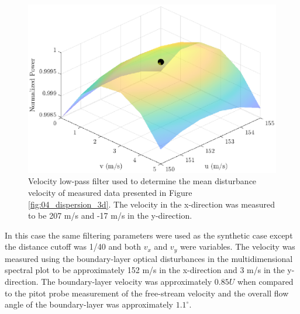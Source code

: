 \begin{figure}
 \centering
 \includegraphics{../matlab/06_single_sensor_filtering/filter_velocity_real.eps}
 \caption{Velocity low-pass filter used to determine the mean disturbance velocity of measured data presented in Figure \ref{fig:04_dispersion_3d}.  The velocity in the x-direction was measured to be 207 m/s and -17 m/s in the y-direction.}
 \label{fig:06_filter_velocity_real}
\end{figure}
In this case the same filtering parameters were used as the synthetic case except the distance cutoff was 1/40 and both $v_x$ and $v_y$ were variables.
The velocity was measured using the boundary-layer optical disturbances in the multidimensional spectral plot to be approximately 152 m/s in the x-direction and 3 m/s in the y-direction.
The boundary-layer velocity was approximately $0.85U$ when compared to the pitot probe measurement of the free-stream velocity and the overall flow angle of the boundary-layer was approximately $1.1^\circ$.

